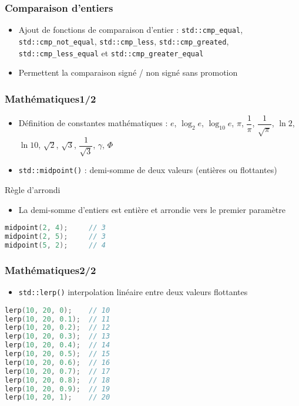 \documentclass[C++.tex]{subfiles}
\begin{document}
\begin{frame}[fragile]
	\frametitle{Comparaison d'entiers}
	\begin{itemize}
		\item Ajout de fonctions de comparaison d'entier : \lstinline|std::cmp_equal|, \lstinline|std::cmp_not_equal|, \lstinline|std::cmp_less|, \lstinline|std::cmp_greated|, \lstinline|std::cmp_less_equal| et \lstinline|std::cmp_greater_equal|
		\item Permettent la comparaison signé / non signé sans promotion
	\end{itemize}
\end{frame}

\begin{frame}[fragile]
	\frametitle{Mathématiques\titlehfill{}1/2}
	\begin{itemize}
		\item Définition de constantes mathématiques : $e$, $\log_2 e$, $\log_{10} e$, $\pi$, $\dfrac{1}{\pi}$, $\dfrac{1}{\sqrt{\pi}}$, $\ln{2}$, $\ln{10}$, $\sqrt{2}$, $\sqrt{3}$, $\dfrac{1}{\sqrt{3}}$, $\gamma$, $\Phi$


		\item \lstinline|std::midpoint()| : demi-somme de deux valeurs (entières ou flottantes)
	\end{itemize}

	\begin{block}{Règle d'arrondi}
		\begin{itemize}
			\item La demi-somme d'entiers est entière et arrondie vers le premier paramètre
		\end{itemize}

		\begin{lstlisting}[language=C++]
midpoint(2, 4);     // 3
midpoint(2, 5);     // 3
midpoint(5, 2);     // 4\end{lstlisting}
	\end{block}
		
\end{frame}

\begin{frame}[fragile]
\frametitle{Mathématiques\titlehfill{}2/2}
	\begin{itemize}
		\item \lstinline|std::lerp()| interpolation linéaire entre deux valeurs flottantes
	\end{itemize}

	\begin{lstlisting}[language=C++]
lerp(10, 20, 0);    // 10
lerp(10, 20, 0.1);  // 11
lerp(10, 20, 0.2);  // 12
lerp(10, 20, 0.3);  // 13
lerp(10, 20, 0.4);  // 14
lerp(10, 20, 0.5);  // 15
lerp(10, 20, 0.6);  // 16
lerp(10, 20, 0.7);  // 17
lerp(10, 20, 0.8);  // 18
lerp(10, 20, 0.9);  // 19
lerp(10, 20, 1);    // 20\end{lstlisting}
\end{frame}
\end{document}
